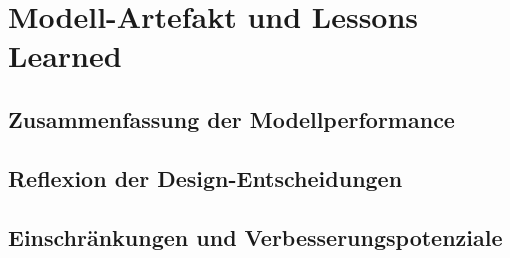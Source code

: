 \chapter{Modell-Artefakt und Lessons Learned}
\section{Zusammenfassung der Modellperformance}
\section{Reflexion der Design-Entscheidungen}
\section{Einschränkungen und Verbesserungspotenziale}